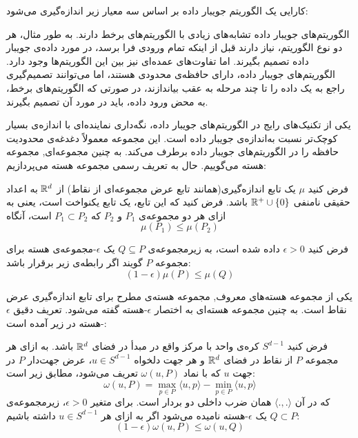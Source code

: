 
کارایی یک الگوریتم جویبار داده بر اساس سه معیار زیر اندازه‌گیری می‌شود:






الگوریتم‌های جویبار داده تشابه‌های زیادی با الگوریتم‌های برخط دارند. به طور مثال، هر دو نوع الگوریتم، نیاز دارند قبل از اینکه تمام ورودی فرا برسد، در مورد داده‌ی جویبار داده تصمیم بگیرند.
اما تفاوت‌های عمده‌ای نیز بین این الگوریتم‌ها وجود دارد.
الگوریتم‌های جویبار داده، دارای حافظه‌ی محدودی هستند، اما می‌توانند تصمیم‌گیری راجع به یک داده را تا چند مرحله به عقب بیاندازند، در صورتی که الگوریتم‌های برخط، به محض ورود داده، باید در مورد آن تصمیم بگیرند.



یکی از تکنیک‌های رایج در الگوریتم‌های جویبار داده، نگه‌داری نماینده‌ای با اندازه‌ی بسیار کوچک‌تر نسبت به‌اندازه‌ی جویبار داده است.
این مجموعه معمولاً دغدغه‌ی محدودیت حافظه را در الگوریتم‌های جویبار داده برطرف می‌کند. به چنین مجموعه‌ای, مجموعه هسته می‌گوییم.
حال به تعریف رسمی مجموعه هسته می‌پردازیم:


فرض کنید $\mu$ یک تابع اندازه‌گیری(همانند تابع عرض مجموعه‌ای از نقاط) از $\mathbb{R}^d$ به اعداد حقیقی نامنفی $\mathbb{R}^+ \cup \left\{ 0 \right\}$ باشد.
فرض کنید که این تابع، یک تابع یکنواخت است، یعنی به ازای هر دو مجموعه‌ی $P_1$ و $P_2$ که $P_1 \subset P_2$ است، آنگاه
$$\mu(P_1) \leq \mu(P_2)$$

فرض کنید $\epsilon > 0$ داده شده است، به زیرمجموعه‌ی $Q \subseteq P$ یک $\epsilon$-مجموعه‌ی هسته برای مجموعه $P$ گویند اگر رابطه‌ی زیر برقرار باشد:
$$(1 - \epsilon) \mu(P) \leq \mu (Q)$$


یکی از مجموعه هسته‌های معروف, مجموعه هسته‌ی مطرح برای تابع اندازه‌گیری عرض نقاط است. به چنین مجموعه هسته‌ای به اختصار $\epsilon$-هسته گفته می‌شود. تعریف دقیق $\epsilon$-هسته در زیر آمده است:


فرض کنید $S^{d-1}$ کره‌ی واحد با مرکز واقع در مبدأ در فضای $\mathbb{R}^d$ باشد.
به ازای هر مجموعه $P$ از‌ نقاط در فضای $\mathbb{R}^d$ و هر جهت دلخواه $u \in S^{d-1}$، عرض جهت‌دار $P$ در جهت $u$ که با نماد $\omega(u, P)$ تعریف می‌شود، مطابق زیر است:
$$\omega(u, P) = \max_{p \in P} \langle u, p\rangle - \min_{p \in P} \langle u, p \rangle$$
که در آن $\langle ., . \rangle$ همان ضرب داخلی دو بردار است.
برای متغیر $\epsilon > 0$، زیرمجموعه‌ی $Q \subset P$ یک $\epsilon$-هسته نامیده می‌شود اگر به ازای هر $u \in S^{d-1}$ داشته باشیم:
$$(1 - \epsilon) \omega(u, P) \leq \omega(u, Q)$$

